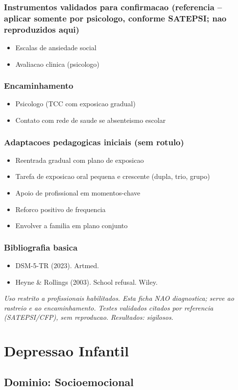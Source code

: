\documentclass[a4paper,11pt]{book}
\newcommand{\avisolegal}{\par\medskip\noindent\footnotesize\itshape
\color{cinza}Uso restrito a profissionais habilitados. Esta ficha NAO diagnostica;
serve ao rastreio e ao encaminhamento. Testes validados citados por referencia
(SATEPSI/CFP), sem reproducao. Resultados: sigilosos.\color{black}\par}
\begin{document}
\subsection*{Instrumentos validados para confirmacao (referencia -- aplicar somente por psicologo, conforme SATEPSI; nao reproduzidos aqui)}
\begin{itemize}
\item Escalas de ansiedade social
\item Avaliacao clinica (psicologo)
\end{itemize}
\subsection*{Encaminhamento}
\begin{itemize}
\item Psicologo (TCC com exposicao gradual)
\item Contato com rede de saude se absenteismo escolar
\end{itemize}
\subsection*{Adaptacoes pedagogicas iniciais (sem rotulo)}
\begin{itemize}
\item Reentrada gradual com plano de exposicao
\item Tarefa de exposicao oral pequena e crescente (dupla, trio, grupo)
\item Apoio de profissional em momentos-chave
\item Reforco positivo de frequencia
\item Envolver a familia em plano conjunto
\end{itemize}
\subsection*{Bibliografia basica}
\begin{itemize}
\item DSM-5-TR (2023). Artmed.
\item Heyne \& Rollings (2003). School refusal. Wiley.
\end{itemize}
\avisolegal


\chapter{Depressao Infantil}
\section*{Dominio: Socioemocional}
\end{document}
